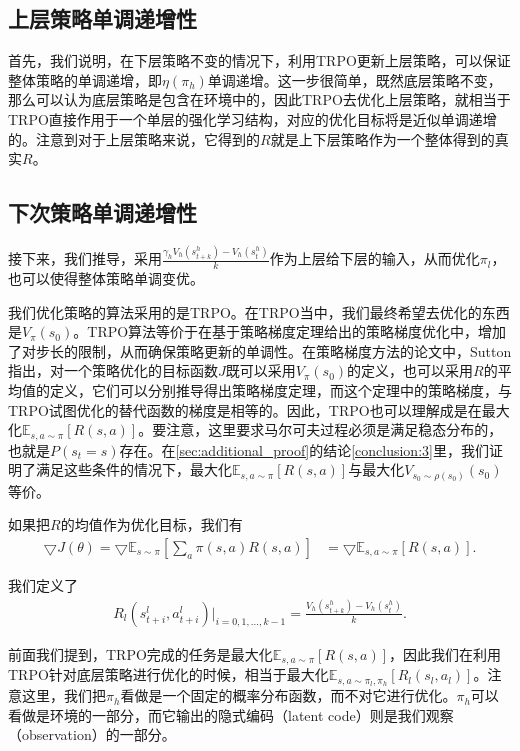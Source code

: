 \subsection{上层策略单调递增性}
首先，我们说明，在下层策略不变的情况下，利用TRPO更新上层策略，可以保证整体策略的单调递增，即$\eta(\pi_h)$单调递增。这一步很简单，既然底层策略不变，那么可以认为底层策略是包含在环境中的，因此TRPO去优化上层策略，就相当于TRPO直接作用于一个单层的强化学习结构，对应的优化目标将是近似单调递增的。注意到对于上层策略来说，它得到的$R$就是上下层策略作为一个整体得到的真实$R$。

\subsection{下次策略单调递增性}
接下来，我们推导，采用$ \frac{\gamma_h V_h(s_{t + k}^h) - V_h(s_{t}^h)}{k}$作为上层给下层的输入，从而优化$\pi_l$，也可以使得整体策略单调变优。

我们优化策略的算法采用的是TRPO\cite{TRPO}。在TRPO当中，我们最终希望去优化的东西是$V_{\pi}(s_0)$。TRPO算法等价于在基于策略梯度定理给出的策略梯度优化中，增加了对步长的限制，从而确保策略更新的单调性。在策略梯度方法的论文\cite{policy_gradient_theorem}中，Sutton指出，对一个策略优化的目标函数$J$既可以采用$V_{\pi}(s_0)$的定义，也可以采用$R$的平均值的定义，它们可以分别推导得出策略梯度定理，而这个定理中的策略梯度，与TRPO试图优化的替代函数的梯度是相等的。因此，TRPO也可以理解成是在最大化$\mathbb{E}_{s, a \sim \pi}[R(s, a)]$。要注意，这里要求马尔可夫过程必须是满足稳态分布的，也就是$P(s_t = s)$存在。在\ref{sec:additional_proof}的结论\ref{conclusion:3}里，我们证明了满足这些条件的情况下，最大化$\mathbb{E}_{s, a \sim \pi}[R(s, a)]$与最大化$V_{s_0 \sim \rho(s_0)}(s_0)$等价。

如果把$R$的均值作为优化目标，我们有
\begin{align}
  \bigtriangledown J(\theta) = \bigtriangledown \mathbb{E}_{s\sim\pi}[\sum_{a} \pi(s, a) R(s, a)]
  &= \bigtriangledown \mathbb{E}_{s, a\sim\pi}[R(s, a)].
  \label{eq:policy_gradient}
\end{align}

我们定义了
\begin{align}
  R_l(s_{t + i}^l, a_{t + i}^l)|_{i = 0,1,...,k-1} = \frac{V_h(s_{t + k}^h) - V_h(s_{t}^h)}{k}.
  \label{eq:R_low}
\end{align}

前面我们提到，TRPO完成的任务是最大化$\mathbb{E}_{s, a \sim \pi}[R(s, a)]$，因此我们在利用TRPO针对底层策略进行优化的时候，相当于最大化$\mathbb{E}_{s, a \sim \pi_l, \pi_h}[R_l(s_l, a_l)]$。注意这里，我们把$\pi_h$看做是一个固定的概率分布函数，而不对它进行优化。$\pi_h$可以看做是环境的一部分，而它输出的隐式编码（latent code）则是我们观察（observation）的一部分。

